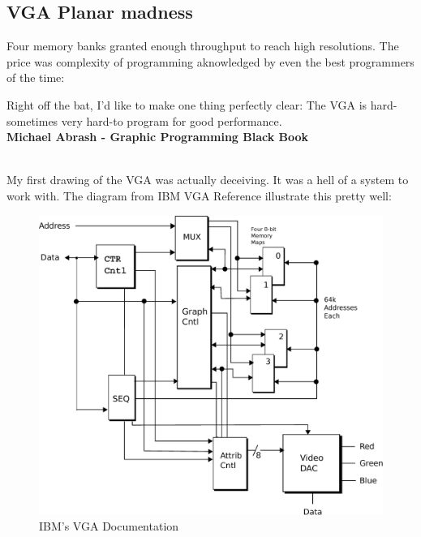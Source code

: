 \documentclass[book.tex]{subfiles}
\begin{document}
\subsection{VGA Planar madness}

Four memory banks granted enough throughput to reach high resolutions. The price was complexity of programming aknowledged by even the best programmers of the time:\\

 \begin{fancyquotes}
   Right off the bat, I'd like to make one thing perfectly clear: The VGA is hard-sometimes very hard-to program for good performance.
 \bigskip \\
\textbf{Michael Abrash - Graphic Programming Black Book}
 \end{fancyquotes}
 \\
\bigskip
My first drawing of the VGA was actually deceiving. It was a hell of a system to work with. The diagram from IBM VGA Reference illustrate this pretty well:\\
 \begin{figure}[H]
\centering
\includegraphics[scale=0.38]{imgs/ibm_vga.eps}
%
\caption{IBM's VGA Documentation}
\label{fig:ibm_vga}
\end{figure}

\bigskip
\end{document}
